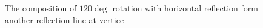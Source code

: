 \begin{figure}[ht]
    \centering
    \caption{The composition of $120\deg$ rotation with horizontal reflection form another reflection line at vertice}
\end{figure}

